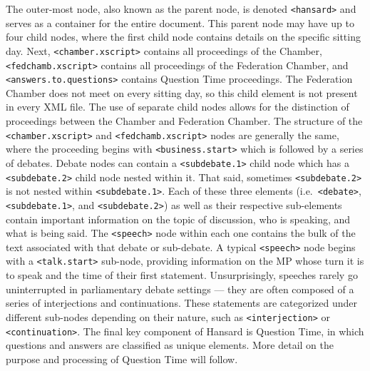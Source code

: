 \documentclass[
  letterpaper,
  DIV=11,
  numbers=noendperiod]{scrartcl}
\begin{document}
The outer-most node, also known as the parent node, is denoted
\texttt{\textless{}hansard\textgreater{}} and serves as a container for
the entire document. This parent node may have up to four child nodes,
where the first child node contains details on the specific sitting day.
Next, \texttt{\textless{}chamber.xscript\textgreater{}} contains all
proceedings of the Chamber,
\texttt{\textless{}fedchamb.xscript\textgreater{}} contains all
proceedings of the Federation Chamber, and
\texttt{\textless{}answers.to.questions\textgreater{}} contains Question
Time proceedings. The Federation Chamber does not meet on every sitting
day, so this child element is not present in every XML file. The use of
separate child nodes allows for the distinction of proceedings between
the Chamber and Federation Chamber. The structure of the
\texttt{\textless{}chamber.xscript\textgreater{}} and
\texttt{\textless{}fedchamb.xscript\textgreater{}} nodes are generally
the same, where the proceeding begins with
\texttt{\textless{}business.start\textgreater{}} which is followed by a
series of debates. Debate nodes can contain a
\texttt{\textless{}subdebate.1\textgreater{}} child node which has a
\texttt{\textless{}subdebate.2\textgreater{}} child node nested within
it. That said, sometimes \texttt{\textless{}subdebate.2\textgreater{}}
is not nested within \texttt{\textless{}subdebate.1\textgreater{}}. Each
of these three elements (i.e.~\texttt{\textless{}debate\textgreater{}},
\texttt{\textless{}subdebate.1\textgreater{}}, and
\texttt{\textless{}subdebate.2\textgreater{}}) as well as their
respective sub-elements contain important information on the topic of
discussion, who is speaking, and what is being said. The
\texttt{\textless{}speech\textgreater{}} node within each one contains
the bulk of the text associated with that debate or sub-debate. A
typical \texttt{\textless{}speech\textgreater{}} node begins with a
\texttt{\textless{}talk.start\textgreater{}} sub-node, providing
information on the MP whose turn it is to speak and the time of their
first statement. Unsurprisingly, speeches rarely go uninterrupted in
parliamentary debate settings --- they are often composed of a series of
interjections and continuations. These statements are categorized under
different sub-nodes depending on their nature, such as
\texttt{\textless{}interjection\textgreater{}} or
\texttt{\textless{}continuation\textgreater{}}. The final key component
of Hansard is Question Time, in which questions and answers are
classified as unique elements. More detail on the purpose and processing
of Question Time will follow.
\end{document}
